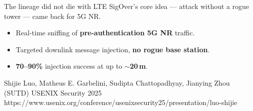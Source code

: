 \begin{frame}{The lineage did not die with LTE}
  \normalsize
  SigOver's core idea --- attack without a rogue tower --- came back for 5G NR.

  \vspace{0.4em}
  \small
  \begin{itemize}\itemsep4pt
    \item Real-time sniffing of \textbf{pre-authentication 5G NR} traffic.
    \item Targeted downlink message injection, \textbf{no rogue base station}.
    \item \textbf{70--90\%} injection success at up to \textbf{\(\sim\)20\,m}.
  \end{itemize}


  \vspace{0.1em}
    {Shijie Luo, Matheus E. Garbelini, Sudipta Chattopadhyay, Jianying Zhou (SUTD)}
    {USENIX Security 2025}
    {https://www.usenix.org/conference/usenixsecurity25/presentation/luo-shijie}

  \vspace{0.1em}
\end{frame}
